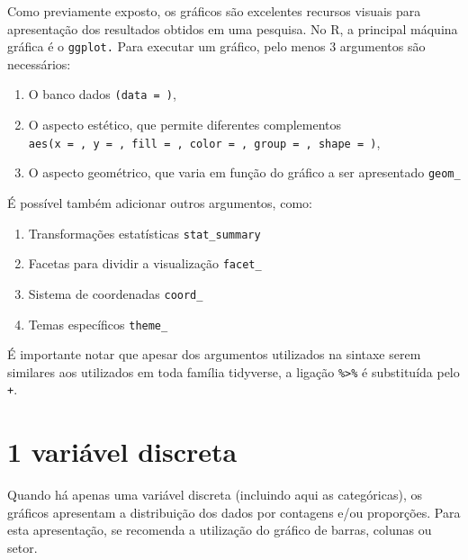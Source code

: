 \documentclass[
]{book}
\providecommand{\tightlist}{%
  \setlength{\itemsep}{0pt}\setlength{\parskip}{0pt}}
\begin{document}
Como previamente exposto, os gráficos são excelentes recursos visuais
para apresentação dos resultados obtidos em uma pesquisa. No R, a
principal máquina gráfica é o \texttt{ggplot.} Para executar um gráfico,
pelo menos 3 argumentos são necessários:

\begin{enumerate}
\def\labelenumi{\arabic{enumi}.}
\tightlist
\item
  O banco dados \texttt{(data\ =\ )},\\
\item
  O aspecto estético, que permite diferentes complementos
  \texttt{aes(x\ =\ ,\ y\ =\ ,\ fill\ =\ ,\ color\ =\ ,\ group\ =\ ,\ shape\ =\ )},\\
\item
  O aspecto geométrico, que varia em função do gráfico a ser apresentado
  \texttt{geom\_}
\end{enumerate}

É possível também adicionar outros argumentos, como:

\begin{enumerate}
\def\labelenumi{\arabic{enumi}.}
\setcounter{enumi}{3}
\tightlist
\item
  Transformações estatísticas \texttt{stat\_summary}\\
\item
  Facetas para dividir a visualização \texttt{facet\_}\\
\item
  Sistema de coordenadas \texttt{coord\_}\\
\item
  Temas específicos \texttt{theme\_}
\end{enumerate}

É importante notar que apesar dos argumentos utilizados na sintaxe serem
similares aos utilizados em toda família tidyverse, a ligação
\texttt{\%\textgreater{}\%} é substituída pelo \texttt{+}.

\hypertarget{variuxe1vel-discreta}{%
\section{1 variável discreta}\label{variuxe1vel-discreta}}

Quando há apenas uma variável discreta (incluindo aqui as categóricas),
os gráficos apresentam a distribuição dos dados por contagens e/ou
proporções. Para esta apresentação, se recomenda a utilização do gráfico
de barras, colunas ou setor.
\end{document}
